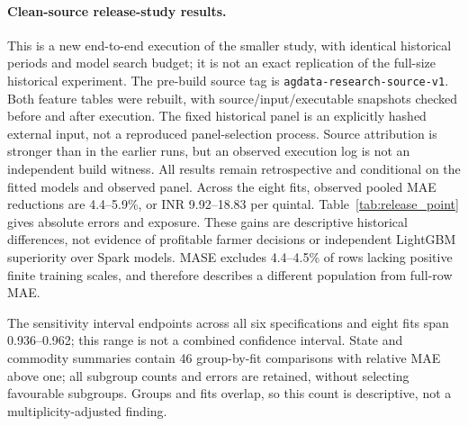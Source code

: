 \paragraph{Clean-source release-study results.}
This is a new end-to-end execution of the smaller study, with identical historical periods and model search budget; it is not an exact replication of the full-size historical experiment. The pre-build source tag is \texttt{agdata-research-source-v1}. Both feature tables were rebuilt, with source/input/executable snapshots checked before and after execution. The fixed historical panel is an explicitly hashed external input, not a reproduced panel-selection process. Source attribution is stronger than in the earlier runs, but an observed execution log is not an independent build witness. All results remain retrospective and conditional on the fitted models and observed panel.
Across the eight fits, observed pooled MAE reductions are 4.4--5.9\%, or INR 9.92--18.83 per quintal. Table~\ref{tab:release_point} gives absolute errors and exposure. These gains are descriptive historical differences, not evidence of profitable farmer decisions or independent LightGBM superiority over Spark models. MASE excludes 4.4--4.5\% of rows lacking positive finite training scales, and therefore describes a different population from full-row MAE.

\begin{table}[t]\centering\small\setlength{\tabcolsep}{3pt}
\caption{Clean-source release study: candidate/persistence MAE in INR per quintal, forecast rows, calendar days and MASE-excluded rows. Forecast rows are not independent replicates.}\label{tab:release_point}

\end{table}

\begin{table}[t]\centering\small\setlength{\tabcolsep}{3pt}
\caption{Circular-block relative-MAE percentile sensitivity intervals (2,000 replicates, nominal 95\%). Actual coverage is unvalidated; all block specifications are shown.}\label{tab:release_circular}

\end{table}

\begin{table}[t]\centering\small\setlength{\tabcolsep}{3pt}
\caption{Non-circular-block sensitivity intervals under the same settings. Long blocks leave few temporal spans and do not establish stationarity or future transportability.}\label{tab:release_noncircular}

\end{table}
The sensitivity interval endpoints across all six specifications and eight fits span 0.936--0.962; this range is not a combined confidence interval. State and commodity summaries contain 46 group-by-fit comparisons with relative MAE above one; all subgroup counts and errors are retained, without selecting favourable subgroups. Groups and fits overlap, so this count is descriptive, not a multiplicity-adjusted finding.


